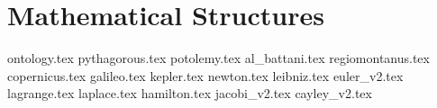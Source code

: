 \part{Mathematical Structures}
{ontology.tex}
{pythagorous.tex}
{potolemy.tex}
{al_battani.tex}
{regiomontanus.tex}
{copernicus.tex}
{galileo.tex}
{kepler.tex}
{newton.tex}
{leibniz.tex}
{euler_v2.tex}
{lagrange.tex}
{laplace.tex}
{hamilton.tex}
{jacobi_v2.tex}
{cayley_v2.tex}
